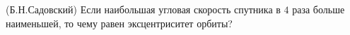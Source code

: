 (Б.Н.Садовский)
Если наибольшая угловая скорость спутника в $4$ раза больше наименьшей, то
чему равен эксцентриситет орбиты?
